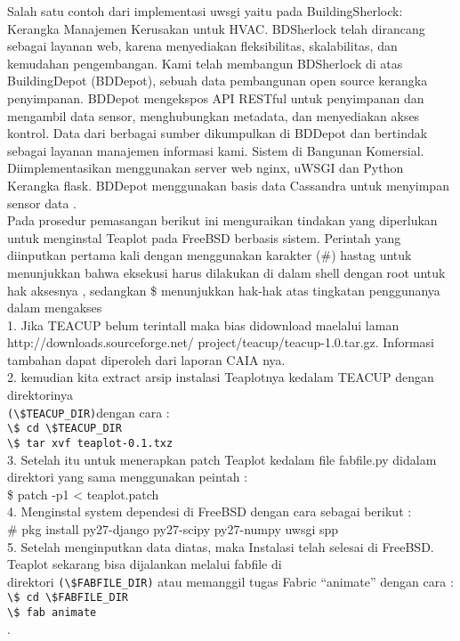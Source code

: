 	Salah satu contoh dari implementasi uwsgi yaitu pada BuildingSherlock: Kerangka Manajemen Kerusakan untuk HVAC. BDSherlock telah dirancang sebagai layanan web, karena menyediakan
fleksibilitas, skalabilitas, dan kemudahan pengembangan. Kami telah membangun BDSherlock
di atas BuildingDepot (BDDepot), sebuah data pembangunan open source
kerangka penyimpanan. BDDepot mengekspos API RESTful untuk penyimpanan dan
mengambil data sensor, menghubungkan metadata, dan menyediakan akses
kontrol. Data dari berbagai sumber dikumpulkan di BDDepot dan bertindak sebagai layanan manajemen informasi kami. Sistem di Bangunan Komersial. Diimplementasikan menggunakan server web nginx, uWSGI dan Python Kerangka flask. BDDepot menggunakan basis data Cassandra untuk menyimpan sensor data  \cite{teraoka2014buildingsherlock}.\\

	Pada prosedur pemasangan berikut ini menguraikan tindakan yang diperlukan untuk menginstal Teaplot pada  FreeBSD berbasis sistem. Perintah yang diinputkan pertama kali  dengan menggunakan karakter  (\#) hastag  untuk menunjukkan bahwa eksekusi harus dilakukan di dalam shell dengan root untuk hak aksesnya , sedangkan \$ menunjukkan hak-hak atas tingkatan penggunanya dalam mengakses\\

1.	Jika TEACUP belum terintall maka bias didownload maelalui laman http://downloads.sourceforge.net/
	project/teacup/teacup-1.0.tar.gz. Informasi tambahan dapat diperoleh dari laporan CAIA nya.\\
2.	kemudian kita extract arsip instalasi Teaplotnya kedalam  TEACUP  dengan direktorinya \\
\verb|(\$TEACUP_DIR)|dengan cara :\\
\verb|\$ cd \$TEACUP_DIR|\\
\verb|\$ tar xvf teaplot-0.1.txz|\\
3.	Setelah itu untuk menerapkan patch Teaplot kedalam file fabfile.py didalam direktori yang sama menggunakan peintah :\\
	\$ patch -p1 < teaplot.patch\\
4.	Menginstal system dependesi di FreeBSD dengan cara sebagai berikut :\\
 	\# pkg install py27-django py27-scipy py27-numpy uwsgi spp\\
5.	Setelah menginputkan data diatas, maka Instalasi telah selesai di FreeBSD. Teaplot sekarang bisa dijalankan melalui fabfile di\\
	direktori \verb|(\$FABFILE_DIR)| atau memanggil tugas Fabric “animate” dengan cara :\\
\verb|\$ cd \$FABFILE_DIR|\\
\verb|\$ fab animate|\\ \cite{true150828teaplot}.\\

